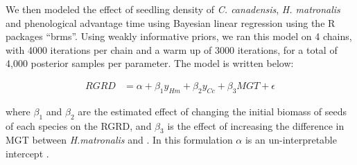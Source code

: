 \documentclass{article}\usepackage[]{graphicx}\usepackage[]{color}
\begin{document}
We then modeled the effect of seedling density of \textit{C. canadensis}, \textit{H. matronalis} and phenological advantage time using Bayesian linear regression  using the R packages ``brms''. Using weakly informative priors, we ran this model on 4 chains, with 4000 iterations per chain and a warm up of 3000 iterations, for a total of 4,000 posterior samples per parameter. The model is written below:

\begin{align*}

RGRD &= \alpha + \beta_{1}y_{Hm} + \beta_{2}y_{Cc} + \beta_{3}MGT + \epsilon

\end{align*}

where  $\beta_{1}$ and $\beta_{2}$ are the estimated effect of changing the initial biomass of seeds of each species on the RGRD, and $\beta_{3}$ is the effect of increasing the difference in MGT between  \textit{H.matronalis} and . In this formulation $\alpha$ is an un-interpretable intercept \citep{Connolly2005}.



\end{document}
